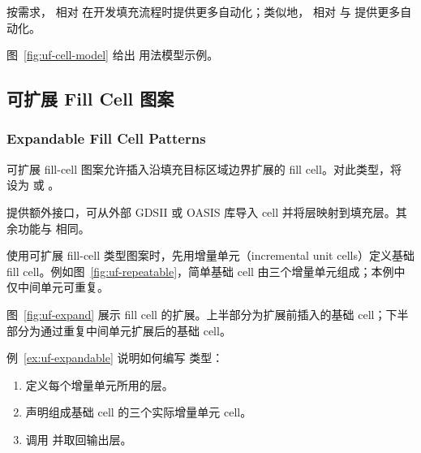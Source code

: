 \begin{noteBox}
按需求， 相对  在开发填充流程时提供更多自动化；类似地， 相对  与  提供更多自动化。
\end{noteBox}

图~\ref{fig:uf-cell-model} 给出  用法模型示例。


\subsection{可扩展 Fill Cell 图案}
\subsubsection*{Expandable Fill Cell Patterns}

可扩展 fill-cell 图案允许插入沿填充目标区域边界扩展的 fill cell。对此类型，将  设为  或 。

 提供额外接口，可从外部 GDSII 或 OASIS 库导入 cell 并将层映射到填充层。其余功能与  相同。

使用可扩展 fill-cell 类型图案时，先用增量单元（incremental unit cells）定义基础 fill cell。例如图~\ref{fig:uf-repeatable}，简单基础 cell 由三个增量单元组成；本例中仅中间单元可重复。


图~\ref{fig:uf-expand} 展示 fill cell 的扩展。上半部分为扩展前插入的基础 cell；下半部分为通过重复中间单元扩展后的基础 cell。


例~\ref{ex:uf-expandable} 说明如何编写  类型：
\begin{enumerate}
  \item 定义每个增量单元所用的层。
  \item 声明组成基础 cell 的三个实际增量单元 cell。
  \item 调用  并取回输出层。
\end{enumerate}

